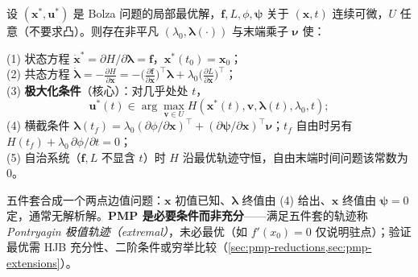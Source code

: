 \begin{theorem}\label{thm:pmp-main}
设 $(\mathbf x^\ast,\mathbf u^\ast)$ 是 Bolza 问题的局部最优解，$\mathbf f,L,\phi,\boldsymbol\psi$ 关于 $(\mathbf x,t)$ 连续可微，$U$ 任意（不要求凸）。则存在非平凡 $(\lambda_0,\boldsymbol\lambda(\cdot))$ 与末端乘子 $\boldsymbol\nu$ 使：

\noindent\textnormal{(1)} 状态方程 $\dot{\mathbf x}^\ast=\partial H/\partial\boldsymbol\lambda=\mathbf f$，$\mathbf x^\ast(t_0)=\mathbf x_0$；\\
\textnormal{(2)} 共态方程 $\displaystyle\dot{\boldsymbol\lambda}=-\frac{\partial H}{\partial\mathbf x}=-\Big(\frac{\partial\mathbf f}{\partial\mathbf x}\Big)^{\!\top}\boldsymbol\lambda+\lambda_0\Big(\frac{\partial L}{\partial\mathbf x}\Big)^{\!\top}$；\\
\textnormal{(3)} \textbf{极大化条件}（核心）：对几乎处处 $t$，
\begin{equation}
  \mathbf u^\ast(t)\in\arg\max_{\mathbf v\in U}H(\mathbf x^\ast(t),\mathbf v,\boldsymbol\lambda(t),\lambda_0,t);
  \label{eq:pmp-max}
\end{equation}
\textnormal{(4)} 横截条件 $\boldsymbol\lambda(t_f)=\lambda_0(\partial\phi/\partial\mathbf x)^\top+(\partial\boldsymbol\psi/\partial\mathbf x)^\top\boldsymbol\nu$；$t_f$ 自由时另有 $H(t_f)+\lambda_0\,\partial\phi/\partial t=0$；\\
\textnormal{(5)} 自治系统（$\mathbf f,L$ 不显含 $t$）时 $H$ 沿最优轨迹守恒，自由末端时间问题该常数为 $0$。
\end{theorem}

五件套合成一个两点边值问题：$\mathbf x$ 初值已知、$\boldsymbol\lambda$ 终值由 (4) 给出、$\mathbf x$ 终值由 $\boldsymbol\psi=0$ 定，通常无解析解。\textbf{PMP 是必要条件而非充分}——满足五件套的轨迹称\emph{Pontryagin 极值轨迹（extremal）}，未必最优（如 $f'(x_0)=0$ 仅说明驻点）；验证最优需 HJB 充分性、二阶条件或穷举比较（\cref{sec:pmp-reductions,sec:pmp-extensions}）。

